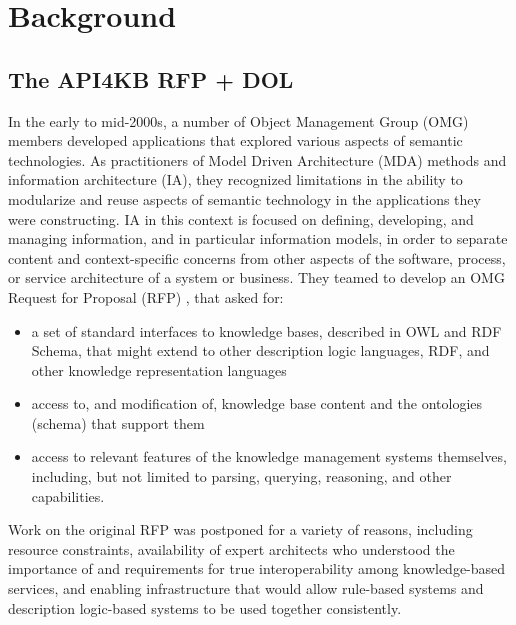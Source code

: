 \documentclass[runningheads]{llncs}
\begin{document}


\section{Background}
\label{sec:bg}
\subsection{The API4KB RFP + DOL}

In the early to mid-2000s, a number of Object Management Group (OMG) members developed applications that explored various aspects of semantic technologies.  As practitioners of Model Driven Architecture (MDA) methods \cite{MDA} and information architecture (IA), they recognized limitations in the ability to modularize and reuse aspects of semantic technology in the applications they were constructing.  IA in this context is focused on defining, developing, and managing information,
and in particular information models, in order to separate content and context-specific
concerns from other aspects of the software, process, or service architecture of a system or business.  They teamed to develop an OMG Request for Proposal (RFP) \cite{API4KB}, that asked for: 
\begin{itemize}
\item  a set of standard interfaces to knowledge bases, described in OWL and RDF Schema, that might extend to other description logic languages, RDF, and other
knowledge representation languages 
\item access to, and modification of, knowledge base content and the ontologies (schema) that support them
\item access to relevant features of the knowledge management systems themselves, including, but not limited to parsing, querying, reasoning, and other capabilities.
\end{itemize}

Work on the original RFP was postponed for a variety of reasons, including resource constraints, availability of expert architects who understood the importance of and requirements for true interoperability among knowledge-based services, and enabling infrastructure that would allow rule-based systems and description logic-based systems to be used together consistently.
\end{document}
